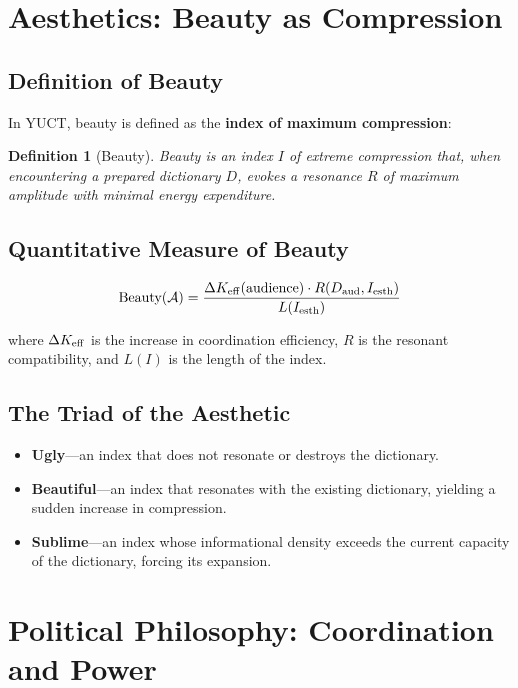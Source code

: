 \documentclass[12pt,a4paper]{article}
\newtheorem{definition}{Definition}[section]
\begin{document}
	\section{Aesthetics: Beauty as Compression}
	
	\subsection{Definition of Beauty}
	
	In YUCT, beauty is defined as the \textbf{index of maximum compression}:
	
	\begin{definition}[Beauty]
		Beauty is an index \(I\) of extreme compression that, when encountering a prepared dictionary \(D\), evokes a resonance \(R\) of maximum amplitude with minimal energy expenditure.
	\end{definition}
	
	\subsection{Quantitative Measure of Beauty}
	
	\begin{equation}
		\text{Beauty}(\mathcal{A}) = \frac{\Delta \Keff(\text{audience}) \cdot R(D_{\text{aud}}, I_{\text{esth}})}{L(I_{\text{esth}})}
	\end{equation}
	
	where \(\Delta \Keff\) is the increase in coordination efficiency, \(R\) is the resonant compatibility, and \(L(I)\) is the length of the index.
	
	\subsection{The Triad of the Aesthetic}
	
	\begin{itemize}
		\item \textbf{Ugly}—an index that does not resonate or destroys the dictionary.
		\item \textbf{Beautiful}—an index that resonates with the existing dictionary, yielding a sudden increase in compression.
		\item \textbf{Sublime}—an index whose informational density exceeds the current capacity of the dictionary, forcing its expansion.
	\end{itemize}
	
	\section{Political Philosophy: Coordination and Power}
	
\end{document}
